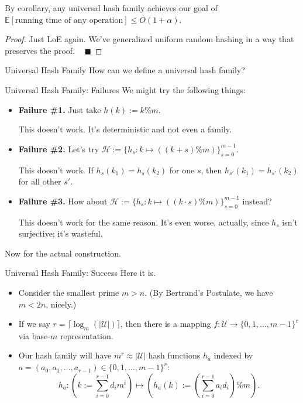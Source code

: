 By corollary, any universal hash family achieves our goal of $\mathbb{E}[\text{running time of any operation}] \leq O(1 + \alpha)$.

\begin{proof}
    Just LoE again.  We've generalized uniform random hashing in a way that preserves the proof. ~ $\blacksquare$
\end{proof}

\begin{problem}{Universal Hash Family}
    How can we define a universal hash family?
\end{problem}

\begin{solution}{Universal Hash Family: Failures}
    We might try the following things:
    \begin{itemize}
        \item \textbf{Failure \#1.} Just take $h(k) := k \% m$.
        
        This doesn't work.  It's deterministic and not even a family.
        \item \textbf{Failure \#2.} Let's try $\mathcal{H} := \{h_s: k \mapsto ((k + s) \% m)\}_{s = 0}^{m - 1}$.
        
        This doesn't work.  If $h_{s}(k_1) = h_{s}(k_2)$ for one $s$, then $h_{s'}(k_1) = h_{s'}(k_2)$ for all other $s'$.
        \item \textbf{Failure \#3.} How about $\mathcal{H} := \{h_s: k \mapsto ((k \cdot s) \% m)\}_{s = 0}^{m - 1}$ instead?

        This doesn't work for the same reason.  It's even worse, actually, since $h_s$ isn't surjective; it's wasteful.
    \end{itemize}
\end{solution}

Now for the actual construction.

\begin{solution}{Universal Hash Family: Success}
    Here it is.
    \begin{itemize}
        \item Consider the smallest prime $m > n$.  (By Bertrand's Postulate, we have $m < 2n$, nicely.)
        \item If we say $r = \lceil \log_m(|\mathcal{U}|) \rceil$, then there is a mapping $f: \mathcal{U} \to \{0, 1, \dots, m - 1\}^r$ via base-$m$ representation.
        \item Our hash family will have $m^r \approx |\mathcal{U}|$ hash functions $h_a$ indexed by $a = (a_0, a_1, \dots, a_{r - 1}) \in \{0, 1, \dots, m - 1\}^r$:
        \[ h_a: \left( k := \sum_{i = 0}^{r - 1} d_i m^i \right) \mapsto \left( h_a(k) :=  \left( \sum_{i = 0}^{r - 1} a_i d_i \right) \% m \right). \]
    \end{itemize}
\end{solution}


